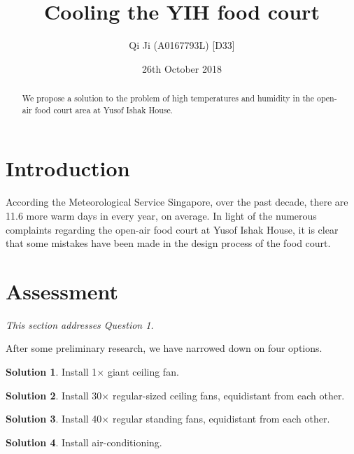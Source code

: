 \documentclass[british,a4paper,]{article}
\title{Cooling the YIH food court}
\author{Qi Ji (A0167793L) [D33]}
\date{26th October 2018}
\theoremstyle{definition}
\newtheorem{solution}{Solution}
\begin{document}
\maketitle

\begin{abstract}
    We propose a solution to the problem of high temperatures and humidity in the
    open-air food court area at Yusof Ishak House.
\end{abstract}

\tableofcontents

\section*{Introduction}

According the Meteorological Service Singapore, over the past decade,
there are 11.6 more warm days in every year, on average.\autocite{MSS}
In light of the numerous complaints regarding the open-air food court at Yusof Ishak House,
it is clear that some mistakes have been made in the design process of the food court.

\newpage

\section{Assessment}

\noindent\emph{This section addresses Question 1.}

\noindent After some preliminary research, we have narrowed down on four options.

\begin{solution} \label{sol1}
    Install 1$\times$ giant ceiling fan.
\end{solution}

\begin{solution} \label{sol2}
    Install 30$\times$ regular-sized ceiling fans, equidistant from each other.
\end{solution}

\begin{solution} \label{sol3}
    Install 40$\times$ regular standing fans, equidistant from each other.
\end{solution}

\begin{solution} \label{sol4}
    Install air-conditioning.
\end{solution}
\end{document}
